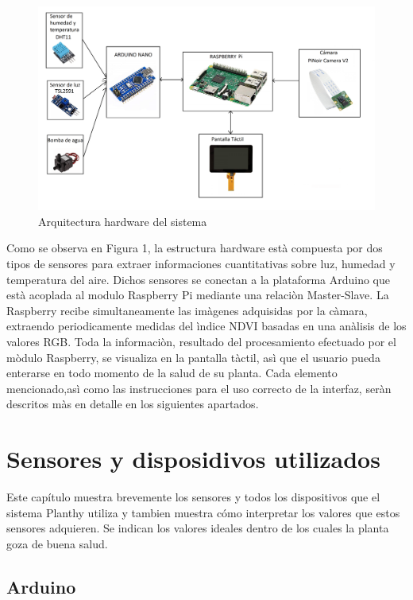 \documentclass[12pt]{article}
\begin{document}
\begin{figure}[H]
	\centering
	\includegraphics[scale=.2]{schema1}
	\caption{Arquitectura hardware del sistema}
	\label{fig:start}
\end{figure}

Como se observa en Figura 1, la estructura hardware està compuesta por dos tipos de sensores para extraer informaciones cuantitativas sobre luz, humedad y temperatura del aire. Dichos sensores se conectan a la plataforma Arduino que està acoplada al modulo Raspberry Pi mediante una relaciòn Master-Slave. 
La Raspberry recibe simultaneamente las imàgenes adquisidas por la càmara, extraendo periodicamente medidas del ìndice NDVI basadas en una anàlisis de los valores RGB. 
Toda la informaciòn, resultado del procesamiento efectuado por el mòdulo Raspberry, se visualiza en la pantalla tàctil, asì que el usuario pueda enterarse en todo momento de la salud de su planta.
Cada elemento mencionado,asì como las instrucciones para el uso correcto de la interfaz, seràn descritos màs en detalle en los siguientes apartados.

\clearpage
\newpage

\section{Sensores y disposidivos utilizados}
Este capítulo muestra brevemente los sensores y todos los dispositivos que el sistema Planthy utiliza y tambien muestra cómo interpretar los valores que estos sensores adquieren. Se indican los valores ideales dentro de los cuales la planta goza de buena salud.

\subsection{Arduino}
\end{document}
